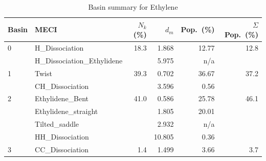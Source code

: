 \begin{table}[htbp]
\centering
\caption{Basin summary for Ethylene}
\begin{tabular}{llrrrr}
\hline
Basin & MECI & $N_k$ (\%) & $d_m$ & Pop.\ (\%) & $\Sigma$ Pop.\ (\%) \\
\hline
0 & H_Dissociation & 18.3 & 1.868 & 12.77 & 12.8 \\
 & H_Dissociation_Ethylidene &  & 5.975 & n/a &  \\
\hline
1 & Twist & 39.3 & 0.702 & 36.67 & 37.2 \\
 & CH_Dissociation &  & 3.596 & 0.56 &  \\
\hline
2 & Ethylidene_Bent & 41.0 & 0.586 & 25.78 & 46.1 \\
 & Ethylidene_straight &  & 1.805 & 20.01 &  \\
 & Tilted_saddle &  & 2.932 & n/a &  \\
 & HH_Dissociation &  & 10.805 & 0.36 &  \\
\hline
3 & CC_Dissociation & 1.4 & 1.499 & 3.66 & 3.7 \\
\hline
\end{tabular}
\end{table}

